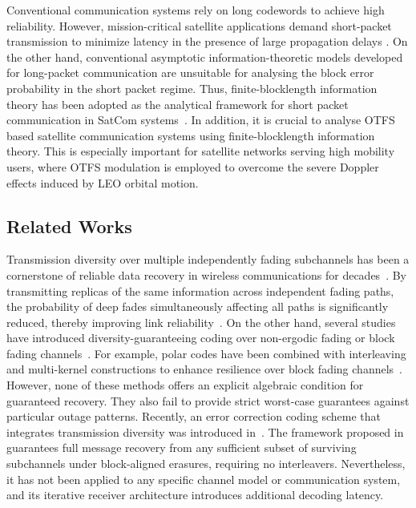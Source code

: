 \documentclass[lettersize,journal]{IEEEtran}
\begin{document}
Conventional communication systems rely on long codewords to achieve high reliability. However, mission-critical satellite applications demand short-packet transmission to minimize latency in the presence of large propagation delays \cite{Durisi2016,Basnayaka2022,Polyanskiy2010}. On the other hand, conventional asymptotic information-theoretic models developed for long-packet communication are unsuitable for analysing the block error probability in the short packet regime. Thus, finite-blocklength information theory has been adopted as the analytical framework for short packet communication in SatCom systems~\cite{10609803}. In addition, it is crucial to analyse OTFS based satellite communication systems using finite-blocklength information theory. This is especially important for satellite networks serving high mobility users, where OTFS modulation is employed to overcome the severe Doppler effects induced by LEO orbital motion.

\subsection{Related Works}
\label{sec:related_works}

\par Transmission diversity over multiple independently fading subchannels has been a cornerstone of reliable data recovery in wireless communications for decades~\cite{661038,11202644}. By transmitting replicas of the same information across independent fading paths, the probability of deep fades simultaneously affecting all paths is significantly reduced, thereby improving link reliability~\cite{Cacuango2025}. On the other hand, several studies have introduced diversity-guaranteeing coding over non-ergodic fading or block fading channels~\cite{Ju2022,5550477,6069883}. For example, polar codes have been combined with interleaving and multi-kernel constructions to enhance resilience over block fading channels~\cite{Ju2022,Niu2021,Mori2010}. However, none of these methods offers an explicit algebraic condition for guaranteed recovery. They also fail to provide strict worst-case guarantees against particular outage patterns. Recently, an error correction coding scheme that integrates transmission diversity was introduced in~\cite{Arikan2025_patent}. The framework proposed in~\cite{Arikan2025_patent} guarantees full message recovery from any sufficient subset of surviving subchannels under block-aligned erasures, requiring no interleavers. Nevertheless, it has not been applied to any specific channel model or communication system, and its iterative receiver architecture introduces additional decoding latency.
\end{document}

